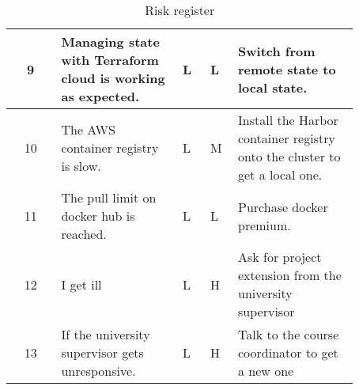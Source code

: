 \begin{table}[]
\begin{tabular}{c|p{0.35\linewidth}|>{\centering}p{0.085\linewidth}|>{\centering}p{0.085\linewidth}|p{0.35\linewidth}}
    \hline
    9           & Managing state with Terraform cloud is working as expected.     & L                           & L                       & Switch from remote state to local state.                                        \\
    \hline
    10          & The AWS container registry is slow.                             & L                           & M                       & Install the Harbor container registry onto the cluster to get a local one.      \\
    \hline
    11          & The pull limit on docker hub is reached.                        & L                           & L                       & Purchase docker premium.                                                        \\
    \hline
    12          & I get ill                                                       & L                           & H                       & Ask for project extension from the university supervisor                        \\
    \hline
    13          & If the university supervisor gets unresponsive.                 & L                           & H                       & Talk to the course coordinator to get a new one                                             
    \end{tabular}
    \centering
    \caption{Risk register}
    \label{tab:risk_register}
\end{table}